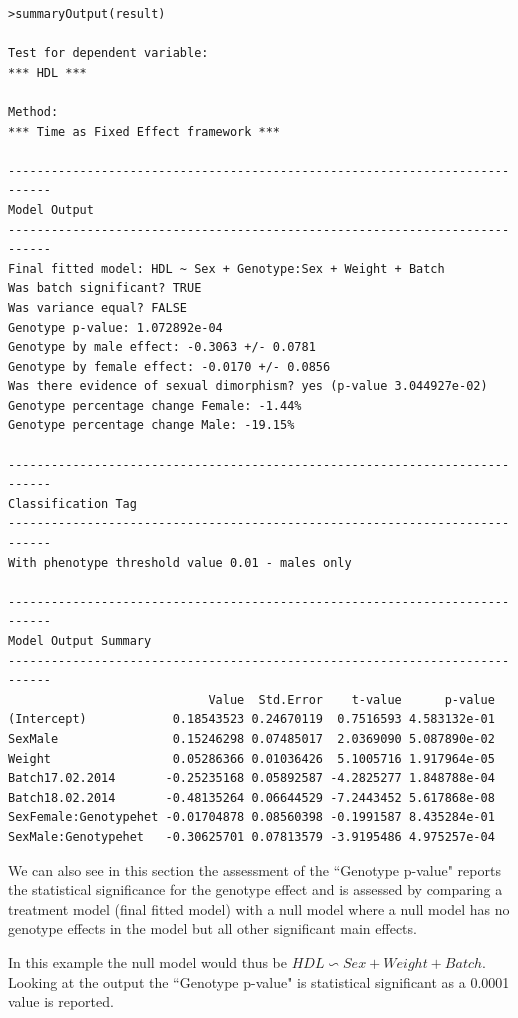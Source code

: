 \documentclass[12pt,a4paper]{article}
\begin{document}
\begingroup
\fontsize{8pt}{12pt}\selectfont
\begin{verbatim}
>summaryOutput(result)

Test for dependent variable:
*** HDL ***

Method:
*** Time as Fixed Effect framework ***

----------------------------------------------------------------------------
Model Output
----------------------------------------------------------------------------
Final fitted model: HDL ~ Sex + Genotype:Sex + Weight + Batch
Was batch significant? TRUE
Was variance equal? FALSE
Genotype p-value: 1.072892e-04
Genotype by male effect: -0.3063 +/- 0.0781
Genotype by female effect: -0.0170 +/- 0.0856
Was there evidence of sexual dimorphism? yes (p-value 3.044927e-02)
Genotype percentage change Female: -1.44%
Genotype percentage change Male: -19.15%

----------------------------------------------------------------------------
Classification Tag
----------------------------------------------------------------------------
With phenotype threshold value 0.01 - males only

----------------------------------------------------------------------------
Model Output Summary
----------------------------------------------------------------------------
                            Value  Std.Error    t-value      p-value
(Intercept)            0.18543523 0.24670119  0.7516593 4.583132e-01
SexMale                0.15246298 0.07485017  2.0369090 5.087890e-02
Weight                 0.05286366 0.01036426  5.1005716 1.917964e-05
Batch17.02.2014       -0.25235168 0.05892587 -4.2825277 1.848788e-04
Batch18.02.2014       -0.48135264 0.06644529 -7.2443452 5.617868e-08
SexFemale:Genotypehet -0.01704878 0.08560398 -0.1991587 8.435284e-01
SexMale:Genotypehet   -0.30625701 0.07813579 -3.9195486 4.975257e-04
\end{verbatim}
\endgroup 

We can also see in this section the assessment of the “Genotype p-value" reports the statistical significance for the genotype effect and is assessed by comparing a treatment model (final fitted model) with a null model where a null model has no genotype effects in the model but all other significant main effects. 

In this example the null model would thus be $HDL \backsim Sex + Weight + Batch$. Looking at the output the “Genotype p-value" is statistical significant as a 0.0001 value is reported. 
\end{document}

